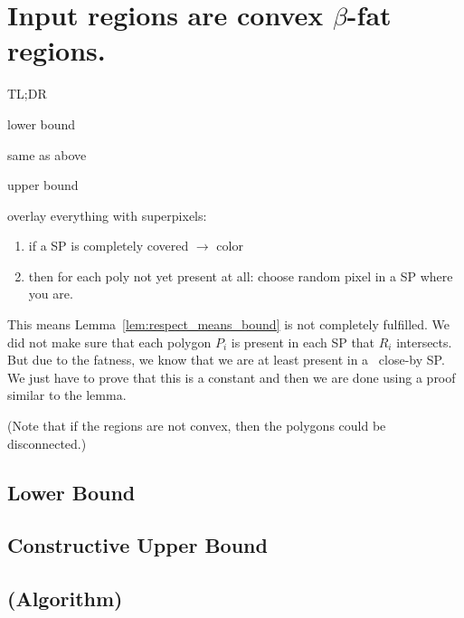 \documentclass[a4paper,UKenglish,cleveref]{lipics-v2019}
\begin{document}




\section{Input regions are convex $\beta$-fat regions.}
\label{sec:fat}
TL;DR

lower bound

same as above

upper bound

overlay everything with superpixels:
\begin{enumerate}
	\item if a SP is completely covered $\rightarrow$ color
	\item then for each poly not yet present at all: choose random pixel in a SP where you are.
\end{enumerate}
This means Lemma~\ref{lem:respect_means_bound} is not completely fulfilled. We did not make sure that each polygon $P_i$ is present in each SP that $R_i$ intersects. But due to the fatness, we know that we are at least present in a ~close-by SP. We just have to prove that this is a constant and then we are done using a proof similar to the lemma.


(Note that if the regions are not convex, then the polygons could be disconnected.)


\subsection{Lower Bound}
\label{sub:fat_lower}




\subsection{Constructive Upper Bound}
\label{sub:fat_upper}




\subsection{(Algorithm)}
\label{sub:fat_algo}
\end{document}
